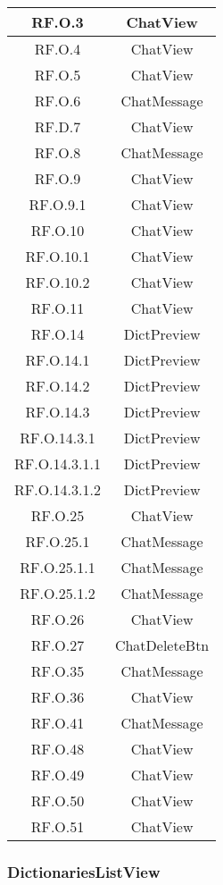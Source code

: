\begin{adjustwidth}{-0.5cm}{-0.5cm}
\begin{longtable}{|c|c|}
    RF.O.3 & ChatView \\
		\hline RF.O.4 & ChatView \\
    \hline RF.O.5 & ChatView \\
    \hline RF.O.6 & ChatMessage \\
    \hline RF.D.7 & ChatView \\
    \hline RF.O.8 & ChatMessage \\
    \hline RF.O.9 & ChatView \\
    \hline RF.O.9.1 & ChatView \\
    \hline RF.O.10 & ChatView \\
    \hline RF.O.10.1 & ChatView \\
    \hline RF.O.10.2 & ChatView \\
    \hline RF.O.11 & ChatView \\
    \hline RF.O.14 & DictPreview \\
    \hline RF.O.14.1 & DictPreview \\
    \hline RF.O.14.2 & DictPreview \\
    \hline RF.O.14.3 & DictPreview \\
    \hline RF.O.14.3.1 & DictPreview \\
    \hline RF.O.14.3.1.1 & DictPreview \\
    \hline RF.O.14.3.1.2 & DictPreview \\
    \hline RF.O.25 & ChatView \\
    \hline RF.O.25.1 & ChatMessage \\
    \hline RF.O.25.1.1 & ChatMessage \\
    \hline RF.O.25.1.2 & ChatMessage \\
    \hline RF.O.26 & ChatView \\
    \hline RF.O.27 & ChatDeleteBtn \\
    \hline RF.O.35 & ChatMessage \\
    \hline RF.O.36 & ChatView \\
    \hline RF.O.41 & ChatMessage \\
    \hline RF.O.48 & ChatView \\
    \hline RF.O.49 & ChatView \\
    \hline RF.O.50 & ChatView \\
    \hline RF.O.51 & ChatView \\
  \end{longtable}
\end{adjustwidth}
\egroup

\subsubsection{DictionariesListView}

